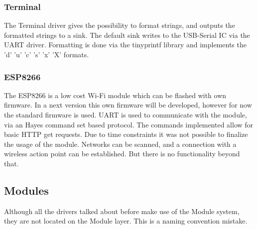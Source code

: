 \subsubsection{Terminal}
The Terminal driver gives the possibility to format strings, and outputs the formatted strings to a sink. The default sink writes to the USB-Serial IC via the UART driver. Formatting is done via the tinyprintf library\cite{sparetimelabs:tinyprintf} and implements the 'd' 'u' 'c' 's' 'x' 'X' formats.
\subsubsection{ESP8266}
The ESP8266 is a low cost Wi-Fi module which can be flashed with own firmware. In a next version this own firmware will be developed, however for now the standard firmware is used. UART is used to communicate with the module, via an Hayes command set based protocol\cite{lonestar:at}. The commands implemented allow for basic HTTP get requests. Due to time constraints it was not possible to finalize the usage of the module. Networks can be scanned, and a connection with a wireless action point can be established. But there is no functionality beyond that.
\subsection{Modules}
Although all the drivers talked about before make use of the Module system, they are not located on the Module layer. This is a naming convention mistake.
